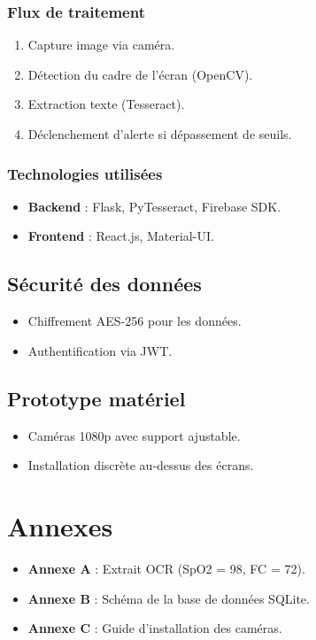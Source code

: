 \subsection{Flux de traitement}
\begin{enumerate}
  \item Capture image via caméra.
  \item Détection du cadre de l’écran (OpenCV).
  \item Extraction texte (Tesseract).
  \item Déclenchement d’alerte si dépassement de seuils.
\end{enumerate}

\subsection{Technologies utilisées}
\begin{itemize}
  \item \textbf{Backend} : Flask, PyTesseract, Firebase SDK.
  \item \textbf{Frontend} : React.js, Material-UI.
\end{itemize}

\section{Sécurité des données}
\begin{itemize}
  \item Chiffrement AES-256 pour les données.
  \item Authentification via JWT.
\end{itemize}

\section{Prototype matériel}
\begin{itemize}
  \item Caméras 1080p avec support ajustable.
  \item Installation discrète au-dessus des écrans.
\end{itemize}

\appendix

\chapter*{Annexes}
\begin{itemize}
  \item \textbf{Annexe A} : Extrait OCR (SpO2 = 98, FC = 72).
  \item \textbf{Annexe B} : Schéma de la base de données SQLite.
  \item \textbf{Annexe C} : Guide d’installation des caméras.
\end{itemize}

% 

